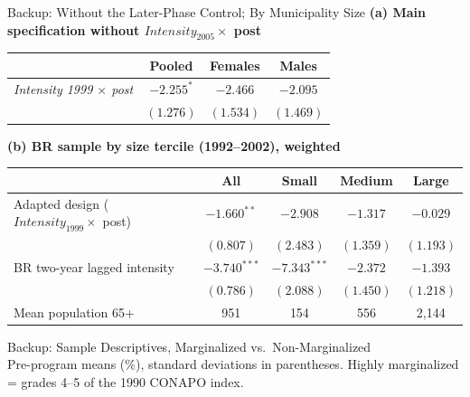 \documentclass[aspectratio=169,usenames,dvipsnames]{beamer}
\begin{document}
\begin{frame}{Backup: Without the Later-Phase Control; By Municipality Size}\label{nocontrol_size}
\small
\textbf{(a) Main specification without $\textit{Intensity}_{2005} \times$ post}
\begin{center}
\begin{tabular}{lccc}
\toprule
 & Pooled & Females & Males \\
\midrule
\textit{Intensity 1999 $\times$ post} & $-2.255^{*}$ & $-2.466$ & $-2.095$ \\
 & $(1.276)$ & $(1.534)$ & $(1.469)$ \\
\bottomrule
\end{tabular}
\end{center}
\vspace{4pt}
\textbf{(b) BR sample by size tercile (1992--2002), weighted}
\begin{center}
\begin{tabular}{lcccc}
\toprule
 & All & Small & Medium & Large \\
\midrule
Adapted design ($\textit{Intensity}_{1999} \times$ post) & $-1.660^{**}$ & $-2.908$ & $-1.317$ & $-0.029$ \\
 & $(0.807)$ & $(2.483)$ & $(1.359)$ & $(1.193)$ \\
BR two-year lagged intensity & $-3.740^{***}$ & $-7.343^{***}$ & $-2.372$ & $-1.393$ \\
 & $(0.786)$ & $(2.088)$ & $(1.450)$ & $(1.218)$ \\
Mean population 65+ & 951 & 154 & 556 & 2,144 \\
\bottomrule
\end{tabular}
\end{center}
\end{frame}


\begin{frame}{Backup: Sample Descriptives, Marginalized vs.\ Non-Marginalized}\label{descr}
\vspace{-2pt}
\centering
\footnotesize
{}\\[3pt]
{\scriptsize Pre-program means (\%), standard deviations in parentheses. Highly marginalized = grades 4--5 of the 1990 CONAPO index.}
\end{frame}
\end{document}
